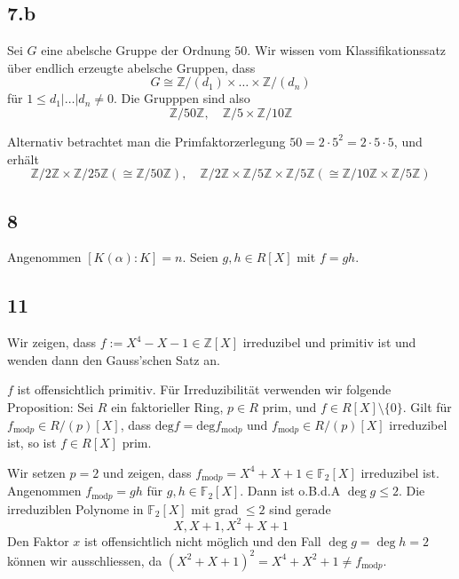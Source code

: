 \subsection*{7.b}
Sei $G$ eine abelsche Gruppe der Ordnung $50$.
Wir wissen vom Klassifikationssatz über endlich erzeugte abelsche Gruppen, dass 
$$
G \cong \mathbb{Z}/(d_1) \times \ldots \times \mathbb{Z}/(d_n)
$$
für $1 \leq d_1 | \ldots | d_n \neq 0$.
Die Grupppen sind also
$$
\mathbb{Z}/50 \mathbb{Z}, \quad \mathbb{Z}/5 \times \mathbb{Z}/10 \mathbb{Z}
$$


Alternativ betrachtet man die Primfaktorzerlegung $50 = 2 \cdot 5^{2} = 2 \cdot 5 \cdot 5$, und erhält
$$
\mathbb{Z}/2 \mathbb{Z} \times \mathbb{Z}/25 \mathbb{Z} \left(
  \cong \mathbb{Z}/50\mathbb{Z}
\right), \quad \mathbb{Z}/2 \mathbb{Z} \times \mathbb{Z}/5 \mathbb{Z} \times \mathbb{Z}/ 5 \mathbb{Z} \left(
  \cong \mathbb{Z}/10 \mathbb{Z} \times \mathbb{Z}/5 \mathbb{Z}
\right)
$$



\subsection*{8}
Angenommen $[K(\alpha) : K] = n$. Seien $g,h \in R[X]$ mit $f = gh$.






\subsection*{11}
Wir zeigen, dass $f := X^{4} - X - 1 \in \mathbb{Z}[X]$ irreduzibel und primitiv ist und wenden dann den Gauss'schen Satz an.

$f$ ist offensichtlich primitiv. Für Irreduzibilität verwenden wir folgende Proposition:
Sei $R$ ein faktorieller Ring, $p \in R$ prim, und $f \in R[X] \setminus \{0\}$.
Gilt für $f_{\mathrm{mod }p} \in R/(p)[X]$, dass $\mathrm{deg} f = \mathrm{deg} f_{\mathrm{mod }p}$ und $f_{\mathrm{mod }p} \in R/(p)[X]$ irreduzibel ist,
so ist $f \in R[X]$ prim.

Wir setzen $p=2$ und zeigen, dass $f_{\mathrm{mod }p} = X^{4} + X + 1 \in \mathbb{F}_2[X]$ irreduzibel ist.
Angenommen $f_{\mathrm{mod }p} = gh$ für $g,h \in \mathbb{F}_2[X]$. 
Dann ist o.B.d.A $\deg g \leq 2$.
Die irreduziblen Polynome in $\mathbb{F}_2[X]$ mit grad $\leq 2$ sind gerade
$$
X, X + 1, X^{2} + X + 1
$$
Den Faktor $x$ ist offensichtlich nicht möglich und
den Fall $\deg g = \deg h = 2$ können wir ausschliessen, da $(X^{2} + X + 1)^{2} = X^{4} + X^{2} + 1 \neq f_{\mathrm{mod }p}$.

